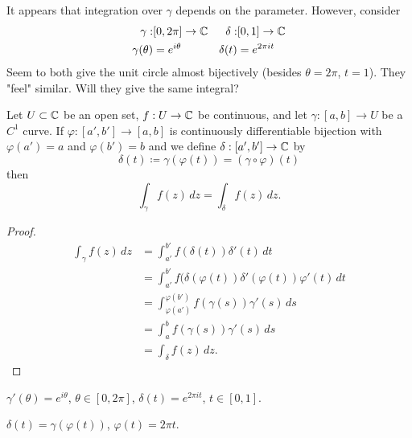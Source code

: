 \documentclass[10pt, a4paper]{article}
\begin{document}
It appears that integration over $\gamma$ depends on the parameter.
However,
consider
\begin{align*}
    \gamma : &[0, 2\pi] \to \mathbb{C} & \delta : &[0, 1] \to \mathbb{C} \\
    \gamma(\theta) &= e ^ {i\theta} & \delta(t) &= e ^ {2\pi it}
\end{align*}
Seem to both give the unit circle almost bijectively
(besides $\theta = 2\pi$,
$t = 1$).
They
"feel"
similar.
Will they give the same integral?

\begin{lemma}
    Let $U \subset \mathbb{C}$ be an open set,
    $f : U \to \mathbb{C}$ be continuous,
    and let $\gamma : [a, b] \to U$ be a $C ^ 1$ curve.
    If $\varphi : [a', b'] \to [a, b]$ is continuously differentiable bijection with $\varphi(a') = a$ and $\varphi(b') = b$ and we define $\delta : [a', b'] \to \mathbb{C}$ by
    \[
    \delta(t) \coloneqq \gamma(\varphi(t)) = (\gamma \circ \varphi)(t)
    \]
    then
    \[
    \int_{\gamma}f(z)\,dz = \int_{\delta}f(z)\,dz.
    \]

    \begin{proof}
        \begin{align*}
            \int_{\gamma}f(z)\,dz &= \int_{a'}^{b'}f(\delta(t))\delta'(t)\,dt \\
            &= \int_{a'}^{b'}f(\delta(\varphi(t))\delta'(\varphi(t))\varphi'(t)\,dt \\
            &= \int_{\varphi(a')}^{\varphi(b')}f(\gamma(s))\gamma'(s)\,ds \\
            &= \int_{a}^{b}f(\gamma(s))\gamma'(s)\,ds \\
            &= \int_{\delta}f(z)\,dz.
        \end{align*}
    \end{proof}
\end{lemma}

\begin{example}
    $\gamma'(\theta) = e ^ {i\theta}$,
    $\theta \in [0, 2\pi]$,
    $\delta(t) = e ^ {2\pi it}$,
    $t \in [0, 1]$.

    $\delta(t) = \gamma(\varphi(t))$,
    $\varphi(t) = 2\pi t$.
\end{example}
\end{document}
